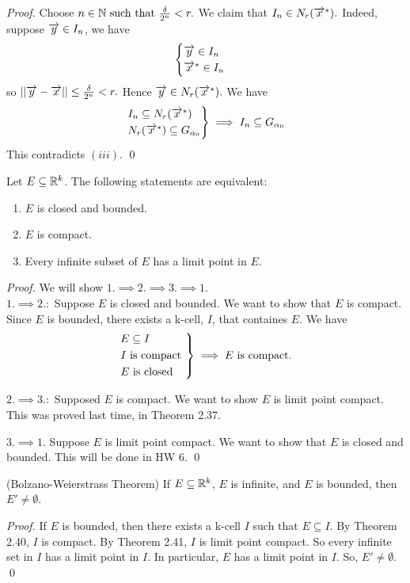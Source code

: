 \documentclass[a4paper]{article}
\begin{document}
\begin{proof}
		Choose $n\in \mathbb{N} \text{ such that } \frac{\delta}{2^n} < r.$ We claim that $I_n \in N_{r}(\overrightarrow{x}^*).$ Indeed,
		suppose $\overrightarrow{y}\in I_n$, we have $$\begin{cases}
			\overrightarrow{y}\in I_n \\
			\overrightarrow{x}^* \in I_n
		\end{cases}$$
		so $||\overrightarrow{y} - \overrightarrow{x}|| \leq \frac{\delta}{2^n} < r.$ Hence $\overrightarrow{y} \in N_{r}(\overrightarrow{x}^*).$ We have
		$$\begin{rcases}
			I_n \subseteq N_{r}(\overrightarrow{x}^*) \\
			N_{r}(\overrightarrow{x}^*) \subseteq G_{\alpha_0}
		\end{rcases}
		\implies I_n \subseteq G_{\alpha_0}$$
		This contradicts $(iii)$. \qed
	\end{proof}

	\begin{theorem}
		Let $E\subseteq \mathbb{R}^k$. The following statements are equivalent:
		\begin{enumerate}
			\item $E$ is closed and bounded.
			\item $E$ is compact.
			\item Every infinite subset of $E$ has a limit point in $E$.
		\end{enumerate}
	\end{theorem}
	\begin{proof}
		We will show $1. \implies 2. \implies 3. \implies 1.$ \\
		$1. \implies 2.:$ Suppose $E$ is closed and bounded. We want to show that $E$ is compact. Since $E$ is bounded,
		there exists a k-cell, $I$, that containes $E$. We have
		$$\begin{rcases}
			E \subseteq I \\
			I \text{ is compact } \\
			E \text{ is closed }
		\end{rcases}
		\implies E \text{ is compact.}$$

		$2. \implies 3.:$ Supposed $E$ is compact. We want to show $E$ is limit point compact. This was proved last time, in Theorem 2.37. $$$$

		$3. \implies 1.$ Suppose $E$ is limit point compact. We want to show that $E$ is closed and bounded. This will be done in HW 6.
		\qed
	\end{proof}

	\begin{theorem}(Bolzano-Weierstrass Theorem)
		If $E\subseteq \mathbb{R}^k$, $E$ is infinite, and $E$ is bounded, then $E'\not = \emptyset.$
	\end{theorem}
	\begin{proof}
		If $E$ is bounded, then there exists a k-cell $I$ such that $E\subseteq I$. By Theorem 2.40, $I$ is compact. By Theorem 2.41, $I$ is
		limit point compact. So every infinite set in $I$ has a limit point in $I$. In particular, $E$ has a limit point in $I$. So, $E' \not = \emptyset$.
		\qed
	\end{proof}
\end{document}
